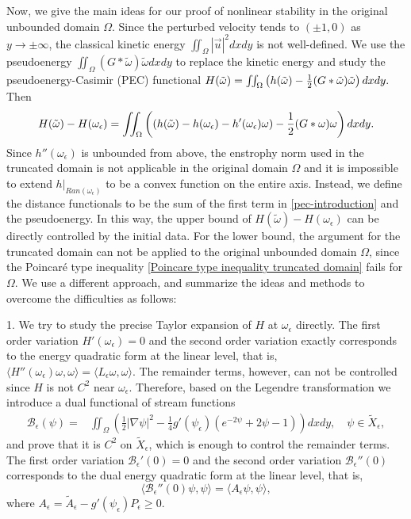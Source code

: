 \documentclass[1 [leqno, 11pt]{amsart}
\numberwithin{equation}{section}
\let\ep=\epsilon
\begin{document}
\begin{CJK*}{GBK}{song}
Now, we give the main ideas for our proof of nonlinear stability in the original unbounded domain $\Omega$.
Since the perturbed velocity  tends to $(\pm1,0)$ as $y\to\pm\infty$, the classical kinetic energy $\iint_{\Omega}|\vec{u}|^2dxdy$ is not well-defined.
We use the pseudoenergy $\iint_{\Omega}(G\ast\tilde \omega)\tilde \omega dxdy$ to replace the  kinetic energy and study the
pseudoenergy-Casimir (PEC) functional
$ H(\tilde\omega)= \iint_{\Omega}\left(h(\tilde\omega)-{1\over2}(G\ast\tilde \omega)\tilde \omega\right)dxdy.$ Then
\begin{align}\label{pec-introduction}
 H(\tilde\omega)- H(\omega_\ep)=\iint_{\Omega}\left((h(\tilde\omega)-h(\omega_\ep)-h'(\omega_\ep)\omega)-{1\over2}(G*\omega)\omega\right)dxdy.
\end{align}
 Since $h''(\omega_\ep)$ is unbounded from above,
the enstrophy norm used in the truncated domain is not applicable in the original domain $\Omega$
and it is impossible to extend $h|_{Ran(\omega_\ep)}$ to be a convex function  on the entire axis. Instead,
 we define the distance functionals to be the sum of the first term in \eqref{pec-introduction} and the  pseudoenergy.
 In this way, the upper bound of $H(\tilde\omega)- H(\omega_\ep)$ can be directly controlled by the initial data. For the lower bound,  the  argument for the truncated domain can not be applied to the original unbounded  domain $\Omega$, since  the Poincar\'e type inequality \eqref{Poincare type inequality truncated domain} fails for $\Omega$. We use a different approach, and  summarize the ideas  and methods to overcome the difficulties  as follows:

1. We try to study the precise Taylor expansion of $H$ at $\omega_\ep$ directly. The first order variation $H'(\omega_\ep)=0$ and the second order variation  exactly corresponds to the energy quadratic form at the linear level, that is, $\langle H''(\omega_\ep)\omega,\omega\rangle=\langle L_\ep\omega,\omega\rangle$.
 The remainder terms, however, can not be controlled since  $H$ is not $C^2$ near $\omega_\ep$.
 Therefore,  based on the Legendre transformation  we introduce a dual functional of stream functions
  \begin{align*}
\mathscr{B}_\ep( \psi)=
  & \iint_{\Omega} \left(\frac 1 2 |\nabla \psi|^2 -\frac 1 4 g'(\psi_\ep)(e^{-2\psi} + 2\psi - 1)\right) dxdy,\quad \psi\in \tilde X_\ep,
\end{align*}
  and prove that  it  is $C^2$ on $\tilde X_\ep$, which is enough to control the remainder terms.
   The first order variation $\mathscr{B}_\ep'(0)=0$ and the second order variation $\mathscr{B}_\ep''(0)$ corresponds to the dual energy quadratic form at the linear level, that is,
   $$\langle \mathscr{B}_\ep''(0)\psi,\psi\rangle=\langle A_\ep\psi,\psi\rangle,$$
   where $A_\ep=\tilde A_\ep-g'(\psi_\ep)P_\ep\geq0$.


\end{CJK*}
\end{document}
